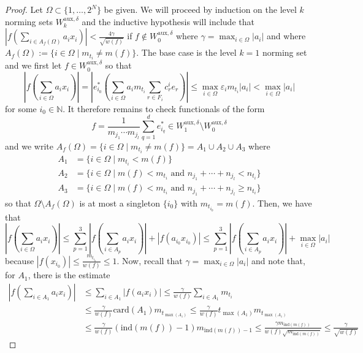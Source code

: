 \documentclass[10pt,a4paper]{amsart}
\newcommand{\N}{\mathbb{N}}
\newcommand{\bes}{\begin{equation*}}
\newcommand{\ees}{\end{equation*}}
\newcommand{\ep}{\varepsilon}
\begin{document}
\begin{proof}
Let $\Omega\subset\{1,\ldots,2^{N}\}$ be given. We will proceed by induction on the level $k$ norming sets $W^{\text{aux},\delta}_{k}$ and the inductive hypothesis will include that $\left\vert f\left(\sum_{i\in A_{f}(\Omega)}a_{i}x_{i}\right)\right\vert<\frac{4\gamma}{\sqrt{w(f)}}$ if $f\notin W_{0}^{\text{aux},\delta}$ where $\gamma=\max_{i\in\Omega}|a_{i}|$ and where $A_{f}(\Omega) :=\{i\in\Omega \mid m_{t_{i}}\neq m(f)\}$. The base case is the level $k=1$ norming set and we first let $f\in W^{\text{aux},\delta}_{0}$ so that   
\bes \left\vert f\left(\sum_{i\in\Omega}a_{i}x_{i}\right)\right\vert = \left\vert e^{*}_{i_{0}}\left(\sum_{i\in\Omega}a_{i}m_{t_{i}}\sum_{r\in F_{i}}c^{i}_{r}e_{r} \right)\right\vert \leq \max_{i\in\Omega}\ep_{i}m_{t_{i}}|a_{i}| < \max_{i\in\Omega}|a_{i}| \ees
for some $i_{0}\in\N$. It therefore remains to check functionals of the form
\bes f=\frac{1}{m_{j_{1}}\cdots m_{j_{l}}}\sum_{q=1}^{d}e^{*}_{i_{q}}\in W^{\text{aux},\delta}_{1}\setminus W^{\text{aux},\delta}_{0} \ees
and we write $A_{f}(\Omega)=\{ i\in\Omega \mid m_{t_{i}}\neq m(f)\}=A_{1}\cup A_{2}\cup A_{3}$ where
\begin{align*} A_{1}&=\{ i\in\Omega \mid m_{t_{i}}<m(f)\} \\ A_{2}&=\{ i\in\Omega \mid m(f)<m_{t_{i}}\text{ and } n_{j_{1}}+\cdots+n_{j_{l}}<n_{t_{i}}\} \\ A_{3}&=\{ i\in\Omega \mid m(f)<m_{t_{i}} \text{ and } n_{j_{1}}+\cdots+n_{j_{l}}\geq n_{t_{i}}\} \end{align*}
so that $\Omega\setminus A_{f}(\Omega)$ is at most a singleton $\{i_{0}\}$ with $m_{t_{i_{0}}}=m(f)$. Then, we have that
\bes \left\vert f\left(\sum_{i\in\Omega}a_{i}x_{i}\right)\right\vert\leq \sum_{p=1}^{3}\left\vert f\left(\sum_{i\in A_{p}}a_{i}x_{i}\right)\right\vert + |f(a_{i_{0}}x_{i_{0}})|\leq \sum_{p=1}^{3}\left\vert f\left(\sum_{i\in A_{p}}a_{i}x_{i}\right)\right\vert + \max_{i\in\Omega}|a_{i}| \ees
because $|f(x_{i_{0}})|\leq \frac{m_{t_{i_{0}}}}{w(f)}\leq 1$. Now, recall that $\gamma=\max_{i\in\Omega}|a_{i}|$ and note that, for $A_{1}$, there is the estimate
\begin{align*} \left\vert f\left(\sum_{i\in A_{1}}a_{i}x_{i}\right)\right\vert&\leq \sum_{i\in A_{1}}|f(a_{i}x_{i})|\leq \frac{\gamma}{w(f)}\sum_{i\in A_{1}}m_{t_{i}} \\ &\leq \frac{\gamma}{w(f)}\text{card}(A_{1})m_{t_{\max(A_{1})}} \leq \frac{\gamma}{w(f)}t_{\max(A_{1})}m_{t_{\max(A_{1})}} \\ &\leq \frac{\gamma}{w(f)}(\text{ind}(m(f))-1)m_{\text{ind}(m(f))-1} \leq \frac{\gamma m_{\text{ind}(m(f))}}{w(f)\sqrt{m_{\text{ind}(m(f))}}} \leq \frac{\gamma}{\sqrt{w(f)}}\end{align*}

\end{proof}
\end{document}
